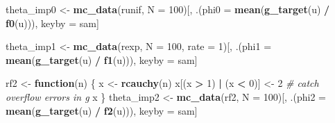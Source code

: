 \documentclass[]{book}
\newenvironment{Shaded}{\begin{snugshade}}{\end{snugshade}}
\newcommand{\CommentTok}[1]{\textcolor[rgb]{0.56,0.35,0.01}{\textit{#1}}}
\newcommand{\ControlFlowTok}[1]{\textcolor[rgb]{0.13,0.29,0.53}{\textbf{#1}}}
\newcommand{\DataTypeTok}[1]{\textcolor[rgb]{0.13,0.29,0.53}{#1}}
\newcommand{\DecValTok}[1]{\textcolor[rgb]{0.00,0.00,0.81}{#1}}
\newcommand{\KeywordTok}[1]{\textcolor[rgb]{0.13,0.29,0.53}{\textbf{#1}}}
\newcommand{\NormalTok}[1]{#1}
\newcommand{\OperatorTok}[1]{\textcolor[rgb]{0.81,0.36,0.00}{\textbf{#1}}}
\newcommand{\StringTok}[1]{\textcolor[rgb]{0.31,0.60,0.02}{#1}}
\theoremstyle{definition}
\theoremstyle{definition}
\theoremstyle{definition}
\theoremstyle{remark}
\begin{document}
\begin{Shaded}
\begin{Highlighting}[]
\NormalTok{theta_imp0 <-}
\StringTok{  }\KeywordTok{mc_data}\NormalTok{(runif, }\DataTypeTok{N =} \DecValTok{100}\NormalTok{)[,}
\NormalTok{                          .(}\DataTypeTok{phi0 =} \KeywordTok{mean}\NormalTok{(}\KeywordTok{g_target}\NormalTok{(u) }\OperatorTok{/}\StringTok{ }\KeywordTok{f0}\NormalTok{(u))),}
\NormalTok{                          keyby =}\StringTok{ }\NormalTok{sam]}
\end{Highlighting}
\end{Shaded}

\begin{Shaded}
\begin{Highlighting}[]
\NormalTok{theta_imp1 <-}
\StringTok{  }\KeywordTok{mc_data}\NormalTok{(rexp, }\DataTypeTok{N =} \DecValTok{100}\NormalTok{, }\DataTypeTok{rate =} \DecValTok{1}\NormalTok{)[,}
\NormalTok{                                   .(}\DataTypeTok{phi1 =} \KeywordTok{mean}\NormalTok{(}\KeywordTok{g_target}\NormalTok{(u) }\OperatorTok{/}\StringTok{ }\KeywordTok{f1}\NormalTok{(u))),}
\NormalTok{                                   keyby =}\StringTok{ }\NormalTok{sam]}
\end{Highlighting}
\end{Shaded}

\begin{Shaded}
\begin{Highlighting}[]
\NormalTok{rf2 <-}\StringTok{ }\ControlFlowTok{function}\NormalTok{(n) \{}
\NormalTok{  x <-}\StringTok{ }\KeywordTok{rcauchy}\NormalTok{(n)}
\NormalTok{  x[(x }\OperatorTok{>}\StringTok{ }\DecValTok{1}\NormalTok{) }\OperatorTok{|}\StringTok{ }\NormalTok{(x }\OperatorTok{<}\StringTok{ }\DecValTok{0}\NormalTok{)] <-}\StringTok{ }\DecValTok{2} \CommentTok{# catch overflow errors in g}
\NormalTok{  x}
\NormalTok{\}}
\NormalTok{theta_imp2 <-}
\StringTok{  }\KeywordTok{mc_data}\NormalTok{(rf2, }\DataTypeTok{N =} \DecValTok{100}\NormalTok{)[,}
\NormalTok{                        .(}\DataTypeTok{phi2 =} \KeywordTok{mean}\NormalTok{(}\KeywordTok{g_target}\NormalTok{(u) }\OperatorTok{/}\StringTok{ }\KeywordTok{f2}\NormalTok{(u))),}
\NormalTok{                        keyby =}\StringTok{ }\NormalTok{sam]}
\end{Highlighting}
\end{Shaded}
\end{document}
